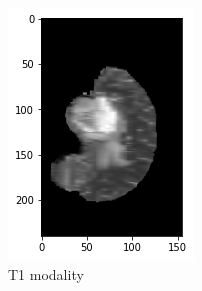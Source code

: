 \begin{figure}[H]
\begin{subfigure}{.2\textwidth}
        \includegraphics[width=\linewidth]{chapters/04_segmentation/images/brats/2.png}
        \caption{T1 modality}
    \end{subfigure}%
        \begin{subfigure}{.2\textwidth}
        \centering

\end{subfigure}
\end{figure}
